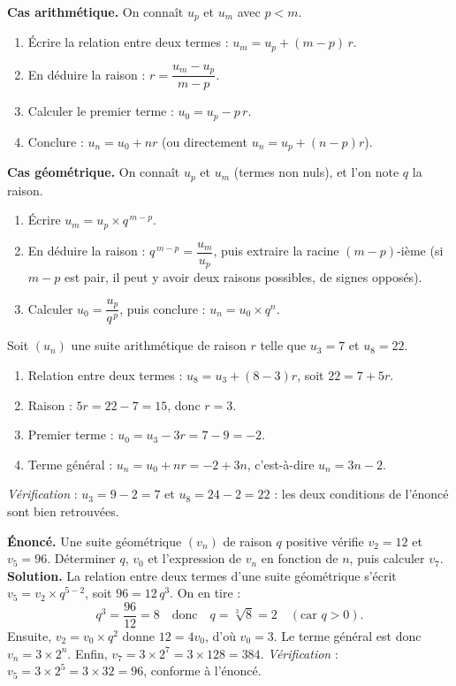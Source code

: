 \documentclass[11pt]{article}
\begin{document}
\begin{methode}
\textbf{Cas arithmétique.} On connaît $u_p$ et $u_m$ avec $p<m$.
\begin{enumerate}
\item Écrire la relation entre deux termes : $u_m = u_p + (m-p)\,r$.
\item En déduire la raison : $r = \dfrac{u_m - u_p}{m-p}$.
\item Calculer le premier terme : $u_0 = u_p - p\,r$.
\item Conclure : $u_n = u_0 + nr$ (ou directement $u_n = u_p + (n-p)r$).
\end{enumerate}
\textbf{Cas géométrique.} On connaît $u_p$ et $u_m$ (termes non nuls), et l'on note $q$ la raison.
\begin{enumerate}
\item Écrire $u_m = u_p \times q^{\,m-p}$.
\item En déduire la raison : $q^{\,m-p} = \dfrac{u_m}{u_p}$, puis extraire la racine $(m-p)$-ième (si $m-p$ est pair, il peut y avoir deux raisons possibles, de signes opposés).
\item Calculer $u_0 = \dfrac{u_p}{q^{\,p}}$, puis conclure : $u_n = u_0 \times q^n$.
\end{enumerate}
\end{methode}

\begin{exemplebox}[Suite arithmétique : $u_3 = 7$ et $u_8 = 22$]
Soit $(u_n)$ une suite arithmétique de raison $r$ telle que $u_3 = 7$ et $u_8 = 22$.
\begin{enumerate}
\item Relation entre deux termes : $u_8 = u_3 + (8-3)r$, soit $22 = 7 + 5r$.
\item Raison : $5r = 22-7 = 15$, donc $r = 3$.
\item Premier terme : $u_0 = u_3 - 3r = 7 - 9 = -2$.
\item Terme général : $u_n = u_0 + nr = -2 + 3n$, c'est-à-dire $u_n = 3n-2$.
\end{enumerate}
\emph{Vérification} : $u_3 = 9-2=7$ et $u_8 = 24-2 = 22$ : les deux conditions de l'énoncé sont bien retrouvées.
\end{exemplebox}

\begin{exoresolu}
\textbf{Énoncé.} Une suite géométrique $(v_n)$ de raison $q$ positive vérifie $v_2 = 12$ et $v_5 = 96$. Déterminer $q$, $v_0$ et l'expression de $v_n$ en fonction de $n$, puis calculer $v_7$.
\tcblower
\textbf{Solution.} La relation entre deux termes d'une suite géométrique s'écrit $v_5 = v_2 \times q^{5-2}$, soit $96 = 12\,q^3$. On en tire :
\[ q^3 = \frac{96}{12} = 8 \quad \text{donc} \quad q = \sqrt[3]{8} = 2 \quad (\text{car } q>0). \]
Ensuite, $v_2 = v_0 \times q^2$ donne $12 = 4v_0$, d'où $v_0 = 3$.
Le terme général est donc $v_n = 3 \times 2^n$.
Enfin, $v_7 = 3 \times 2^7 = 3 \times 128 = 384$.
\emph{Vérification} : $v_5 = 3 \times 2^5 = 3 \times 32 = 96$, conforme à l'énoncé.
\end{exoresolu}
\end{document}
